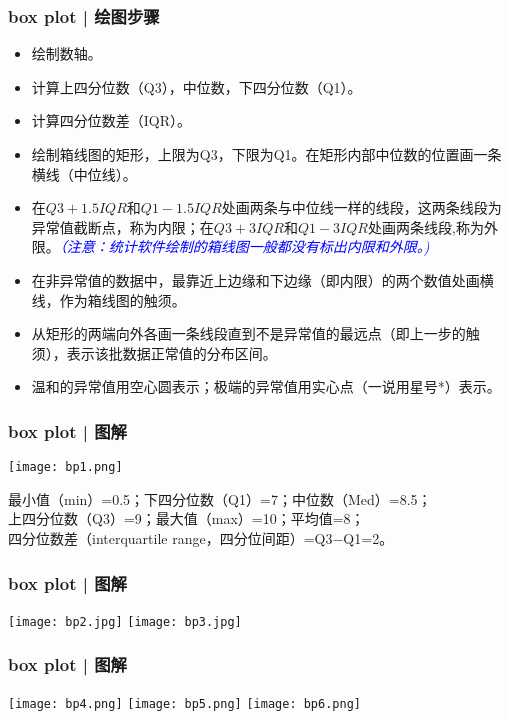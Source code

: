 \begin{frame}
  \frametitle{box plot | 绘图步骤}
  \begin{itemize}[<+-|alert@+>]
  \item 绘制数轴。
  \item 计算上四分位数（Q3），中位数，下四分位数（Q1）。
  \item 计算四分位数差（IQR）。
  \item 绘制箱线图的矩形，上限为Q3，下限为Q1。在矩形内部中位数的位置画一条横线（中位线）。
  \item 在$Q3 + 1.5IQR$和$Q1 - 1.5IQR$处画两条与中位线一样的线段，这两条线段为异常值截断点，称为内限；在$Q3 + 3IQR$和$Q1 - 3IQR$处画两条线段,称为外限。\textcolor{blue}{\textit{（注意：统计软件绘制的箱线图一般都没有标出内限和外限。)}}
  \item 在非异常值的数据中，最靠近上边缘和下边缘（即内限）的两个数值处画横线，作为箱线图的触须。
  \item 从矩形的两端向外各画一条线段直到不是异常值的最远点（即上一步的触须），表示该批数据正常值的分布区间。
  \item 温和的异常值用空心圆表示；极端的异常值用实心点（一说用星号*）表示。
  \end{itemize}
\end{frame}

\begin{frame}
  \frametitle{box plot | \alert{图解}}
  \begin{center}
    \texttt{[image: bp1.png]}
  \end{center}
  \vspace{0.3cm}
  最小值（min）=0.5；下四分位数（Q1）=7；中位数（Med）=8.5；\\
  上四分位数（Q3）=9；最大值（max）=10；平均值=8；\\
  四分位数差（interquartile range，四分位间距）=Q3−Q1=2。
\end{frame}

\begin{frame}
  \frametitle{box plot | \alert{图解}}
  \begin{center}
    \texttt{[image: bp2.jpg]}
    \vspace{1cm}
    \texttt{[image: bp3.jpg]}
  \end{center}
\end{frame}


\begin{frame}
  \frametitle{box plot | \alert{图解}}
  \begin{center}
    \texttt{[image: bp4.png]}
    \hspace{1.5cm}
    \texttt{[image: bp5.png]}
    \vspace{0.8cm}
    \texttt{[image: bp6.png]}
  \end{center}
\end{frame}

